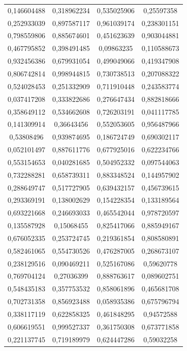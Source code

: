 \documentclass[a4paper,12pt]{article}
\begin{document}
\begin{longtable}{|c|c|c|c|}
	0,146604488 & 0,318962234 & 0,535025906 & 0,25597358 \\
	0,252933039 & 0,897587117 & 0,961039174 & 0,238301151 \\
	0,798559806 & 0,885674601 & 0,451623639 & 0,903044881 \\
	0,467795852 & 0,398491485 & 0,09863235 & 0,110588673 \\
	0,932456386 & 0,679931054 & 0,499049066 & 0,419347908 \\
	0,806742814 & 0,998944815 & 0,730738513 & 0,207088322 \\
	0,524028453 & 0,251332909 & 0,711910448 & 0,243583774 \\
	0,037417208 & 0,333822686 & 0,276647434 & 0,882818666 \\
	0,358649112 & 0,534662608 & 0,726203191 & 0,041117785 \\
	0,141309914 & 0,36643456 & 0,552053605 & 0,956487966 \\
	0,53808496 & 0,939874695 & 0,186724749 & 0,690302117 \\
	0,052101497 & 0,887611776 & 0,677925016 & 0,622234766 \\
	0,553154653 & 0,040281685 & 0,504952332 & 0,097544063 \\
	0,732288281 & 0,658739311 & 0,883348524 & 0,144957902 \\
	0,288649747 & 0,517727905 & 0,639432157 & 0,456739615 \\
	0,293369191 & 0,138002629 & 0,154228354 & 0,133189564 \\
	0,693221668 & 0,246693033 & 0,465542044 & 0,978720597 \\
	0,135587928 & 0,15068455 & 0,825417066 & 0,885949167 \\
	0,676052335 & 0,253724745 & 0,219361854 & 0,808580891 \\
	0,582461065 & 0,554730526 & 0,476287005 & 0,268673107 \\
	0,238129516 & 0,090469211 & 0,525167086 & 0,59620778 \\
	0,769704124 & 0,27036399 & 0,888763617 & 0,089602751 \\
	0,548435183 & 0,357753532 & 0,858061896 & 0,465681708 \\
	0,702731358 & 0,856923488 & 0,058935386 & 0,675796794 \\
	0,338117119 & 0,622858325 & 0,461848295 & 0,94572588 \\
	0,606619551 & 0,999527337 & 0,361750308 & 0,673771858 \\
	0,221137745 & 0,719189979 & 0,624447286 & 0,59032258 \\

\end{longtable}
\end{document}
